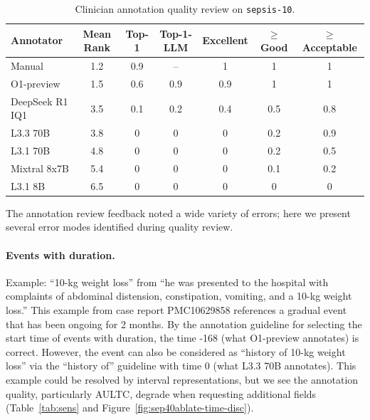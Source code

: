\documentclass[pmlr,twocolumn,10pt]{jmlr} %
\begin{document}
\begin{table}[h]
\centering
\small
\caption{Clinician annotation quality review on \texttt{sepsis-10}.}
\label{tab:sep10review}
\begin{tabular}{lcccccc}
\toprule
Annotator & Mean Rank & Top-1 & Top-1-LLM & Excellent & $\geq$ Good & $\geq$ Acceptable \\
\midrule
Manual & 1.2 & 0.9 & -- & 1 & 1 & 1 \\
O1-preview & 1.5 & 0.6 & 0.9 & 0.9 & 1 & 1 \\
DeepSeek R1 IQ1 & 3.5 & 0.1 & 0.2 & 0.4 & 0.5 & 0.8 \\
L3.3 70B & 3.8 & 0 & 0 & 0 & 0.2 & 0.9 \\
L3.1 70B & 4.8 & 0 & 0 & 0 & 0.2 & 0.5 \\
Mixtral 8x7B & 5.4 & 0 & 0 & 0 & 0.1 & 0.2 \\
L3.1 8B & 6.5 & 0 & 0 & 0 & 0 & 0 \\
\bottomrule
\end{tabular}
\end{table}

The annotation review feedback noted a wide variety of errors; here we present several error modes identified during quality review.

\paragraph{Events with duration.}
Example: ``10-kg weight loss'' from ``he was presented to the hospital with complaints of abdominal distension, constipation, vomiting, and a 10-kg weight loss.''
This example from case report PMC10629858 references a gradual event that has been ongoing for 2 months.
By the annotation guideline for selecting the start time of events with duration, the time -168 (what O1-preview annotates) is correct.
However, the event can also be considered as ``history of 10-kg weight loss'' via the ``history of'' guideline with time 0 (what L3.3 70B annotates).
This example could be resolved by interval representations, but we see the annotation quality, particularly AULTC, degrade when requesting additional fields (Table~\ref{tab:sens} and Figure~\ref{fig:sep40ablate-time-disc}).
\end{document}
